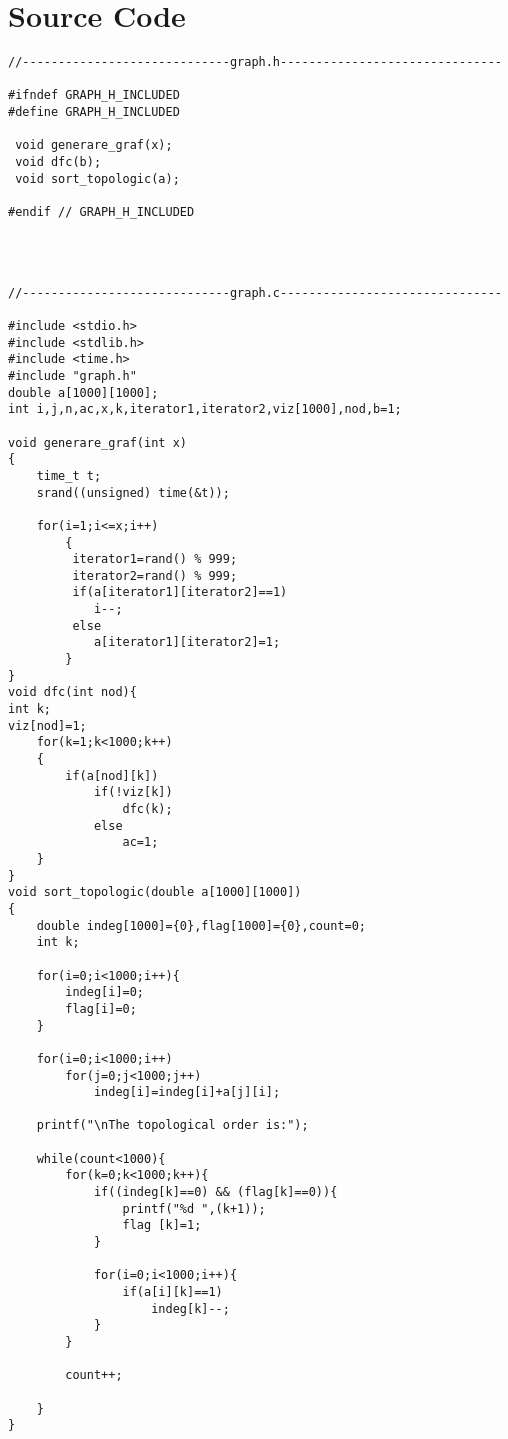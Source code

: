 \documentclass[14pt]{article}
\begin{document}
\section*{Source Code}
\begin{lstlisting}
//-----------------------------graph.h-------------------------------

#ifndef GRAPH_H_INCLUDED
#define GRAPH_H_INCLUDED

 void generare_graf(x);
 void dfc(b);
 void sort_topologic(a);

#endif // GRAPH_H_INCLUDED




\end{lstlisting}
\begin{lstlisting}
//-----------------------------graph.c-------------------------------

#include <stdio.h>
#include <stdlib.h>
#include <time.h>
#include "graph.h"
double a[1000][1000];
int i,j,n,ac,x,k,iterator1,iterator2,viz[1000],nod,b=1;

void generare_graf(int x)
{
    time_t t;
    srand((unsigned) time(&t));

    for(i=1;i<=x;i++)
        {
         iterator1=rand() % 999;
         iterator2=rand() % 999;
         if(a[iterator1][iterator2]==1)
            i--;
         else
            a[iterator1][iterator2]=1;
        }
}
void dfc(int nod){
int k;
viz[nod]=1;
    for(k=1;k<1000;k++)
    {
        if(a[nod][k])
            if(!viz[k])
                dfc(k);
            else
                ac=1;
    }
}
void sort_topologic(double a[1000][1000])
{
    double indeg[1000]={0},flag[1000]={0},count=0;
    int k;

    for(i=0;i<1000;i++){
        indeg[i]=0;
        flag[i]=0;
    }

    for(i=0;i<1000;i++)
        for(j=0;j<1000;j++)
            indeg[i]=indeg[i]+a[j][i];

    printf("\nThe topological order is:");

    while(count<1000){
        for(k=0;k<1000;k++){
            if((indeg[k]==0) && (flag[k]==0)){
                printf("%d ",(k+1));
                flag [k]=1;
            }

            for(i=0;i<1000;i++){
                if(a[i][k]==1)
                    indeg[k]--;
            }
        }

        count++;

    }
}





\end{lstlisting}
\end{document}
